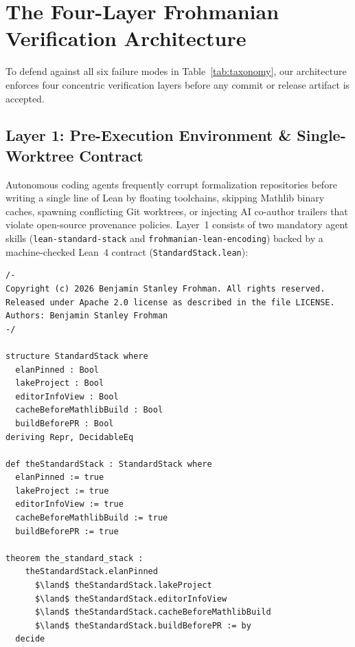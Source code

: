 \documentclass[11pt,a4paper]{article}
\theoremstyle{plain}
\theoremstyle{definition}
\begin{document}
\section{The Four-Layer Frohmanian Verification Architecture}\label{sec:architecture}

To defend against all six failure modes in Table~\ref{tab:taxonomy}, our architecture enforces four concentric verification layers before any commit or release artifact is accepted.

\subsection{Layer 1: Pre-Execution Environment \& Single-Worktree Contract}\label{sec:layer1}

Autonomous coding agents frequently corrupt formalization repositories before writing a single line of Lean by floating toolchains, skipping Mathlib binary caches, spawning conflicting Git worktrees, or injecting AI co-author trailers that violate open-source provenance policies. Layer~1 consists of two mandatory agent skills (\texttt{lean-standard-stack} and \texttt{frohmanian-lean-encoding}) backed by a machine-checked Lean~4 contract (\texttt{StandardStack.lean}):

\begin{lstlisting}[language=Lean4,caption={Machine-checked environment contract (\texttt{lean-kernel-gate/StandardStack.lean}).}]
/-
Copyright (c) 2026 Benjamin Stanley Frohman. All rights reserved.
Released under Apache 2.0 license as described in the file LICENSE.
Authors: Benjamin Stanley Frohman
-/

structure StandardStack where
  elanPinned : Bool
  lakeProject : Bool
  editorInfoView : Bool
  cacheBeforeMathlibBuild : Bool
  buildBeforePR : Bool
deriving Repr, DecidableEq

def theStandardStack : StandardStack where
  elanPinned := true
  lakeProject := true
  editorInfoView := true
  cacheBeforeMathlibBuild := true
  buildBeforePR := true

theorem the_standard_stack :
    theStandardStack.elanPinned
      $\land$ theStandardStack.lakeProject
      $\land$ theStandardStack.editorInfoView
      $\land$ theStandardStack.cacheBeforeMathlibBuild
      $\land$ theStandardStack.buildBeforePR := by
  decide
\end{lstlisting}
\end{document}
